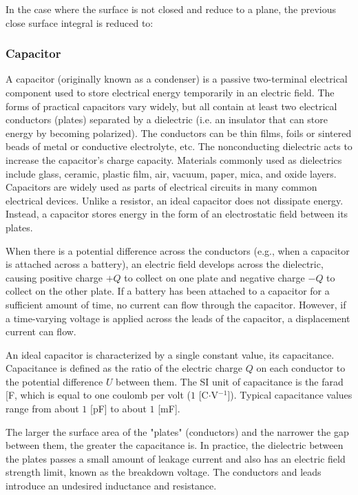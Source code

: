 	In the case where the surface is not closed and reduce to a plane, the previous close surface integral is reduced to:
	
	
	\subsubsection{Capacitor}\label{capacitor}
	A capacitor (originally known as a condenser) is a passive two-terminal electrical component used to store electrical energy temporarily in an electric field. The forms of practical capacitors vary widely, but all contain at least two electrical conductors (plates) separated by a dielectric (i.e. an insulator that can store energy by becoming polarized). The conductors can be thin films, foils or sintered beads of metal or conductive electrolyte, etc. The nonconducting dielectric acts to increase the capacitor's charge capacity. Materials commonly used as dielectrics include glass, ceramic, plastic film, air, vacuum, paper, mica, and oxide layers. Capacitors are widely used as parts of electrical circuits in many common electrical devices. Unlike a resistor, an ideal capacitor does not dissipate energy. Instead, a capacitor stores energy in the form of an electrostatic field between its plates.

	When there is a potential difference across the conductors (e.g., when a capacitor is attached across a battery), an electric field develops across the dielectric, causing positive charge $+Q$ to collect on one plate and negative charge $-Q$ to collect on the other plate. If a battery has been attached to a capacitor for a sufficient amount of time, no current can flow through the capacitor. However, if a time-varying voltage is applied across the leads of the capacitor, a displacement current can flow.

An ideal capacitor is characterized by a single constant value, its capacitance. Capacitance is defined as the ratio of the electric charge $Q$ on each conductor to the potential difference $U$ between them. The SI unit of capacitance is the farad [F, which is equal to one coulomb per volt ($1$ [C$\cdot$V$^{-1}$]). Typical capacitance values range from about $1$ [pF] to about $1$ [mF].

	The larger the surface area of the "plates" (conductors) and the narrower the gap between them, the greater the capacitance is. In practice, the dielectric between the plates passes a small amount of leakage current and also has an electric field strength limit, known as the breakdown voltage. The conductors and leads introduce an undesired inductance and resistance.

